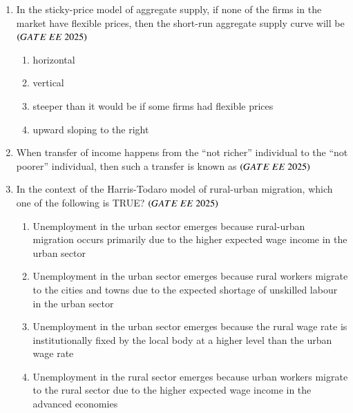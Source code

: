 \documentclass[journal,12pt,onecolumn]{IEEEtran}
\theoremstyle{remark}
\begin{document}
\begin{enumerate}
    \item In the sticky-price model of aggregate supply, if none of the firms in the market have flexible prices, then the short-run aggregate supply curve will be
     \hfill $\brak{GATE\ EE\ 2025}$
    \begin{enumerate}
        \item horizontal
        \item vertical
        \item steeper than it would be if some firms had flexible prices
        \item upward sloping to the right
  \end{enumerate}
\item When transfer of income happens from the ``not richer'' individual to the ``not poorer'' individual, then such a transfer is known as
\hfill $\brak{GATE\ EE\ 2025}$
    \begin{enumerate}
      \end{enumerate}
 
\item In the context of the Harris-Todaro model of rural-urban migration, which one of the following is TRUE?
\hfill $\brak{GATE\ EE\ 2025}$
    \begin{enumerate}
    \item Unemployment in the urban sector emerges because rural-urban migration occurs primarily due to the higher expected wage income in the urban sector
    \item Unemployment in the urban sector emerges because rural workers migrate to the cities and towns due to the expected shortage of unskilled labour in the urban sector
    \item Unemployment in the urban sector emerges because the rural wage rate is institutionally fixed by the local body at a higher level than the urban wage rate
    \item Unemployment in the rural sector emerges because urban workers migrate to the rural sector due to the higher expected wage income in the advanced economies
  \end{enumerate}
 

\end{enumerate}
\end{document}
